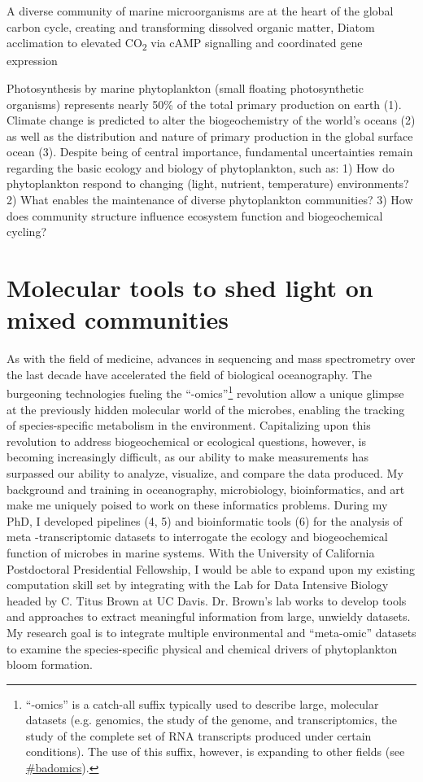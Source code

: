 A diverse community of marine microorganisms are at the heart of the global carbon cycle, creating and transforming dissolved organic matter, 
Diatom acclimation to elevated CO\textsubscript{2} via cAMP signalling and coordinated gene expression

Photosynthesis by marine phytoplankton (small floating photosynthetic organisms) represents nearly 50\% of the total primary production on earth (1). Climate change is predicted to alter the biogeochemistry of the world's oceans (2) as well as the distribution and nature of primary production in the global surface ocean (3). Despite being of central importance, fundamental uncertainties remain regarding the basic ecology and biology of phytoplankton, such as: 1) How do phytoplankton respond to changing (light, nutrient, temperature) environments? 2) What enables the maintenance of diverse phytoplankton communities? 3) How does community structure influence ecosystem function and biogeochemical cycling? 

\section{Molecular tools to shed light on mixed communities}
As with the field of medicine, advances in sequencing and mass spectrometry over the last decade have accelerated the field of biological oceanography. The burgeoning technologies fueling the ``-omics''\footnote{``-omics'' is a catch-all suffix typically used to describe large, molecular datasets (e.g. genomics, the study of the genome, and transcriptomics, the study of the complete set of RNA transcripts produced under certain conditions). The use of this suffix, however, is expanding to other fields (see \href{https://twitter.com/search?q=\%23badomics&src=typd&lang=en}{\#badomics}). }  revolution allow a unique glimpse at the previously hidden molecular world of the microbes, enabling the tracking of species-specific metabolism in the environment. Capitalizing upon this revolution to address biogeochemical or ecological questions, however, is becoming increasingly difficult, as our ability to make measurements has surpassed our ability to analyze, visualize, and compare the data produced. My background and training in oceanography, microbiology, bioinformatics, and art make me uniquely poised to work on these informatics problems. During my PhD, I developed pipelines (4, 5) and bioinformatic tools (6) for the analysis of meta -transcriptomic datasets to interrogate the ecology and biogeochemical function of microbes in marine systems. With the University of California Postdoctoral Presidential Fellowship, I would be able to expand upon my existing computation skill set by integrating with the Lab for Data Intensive Biology headed by C. Titus Brown at UC Davis. Dr. Brown’s lab works to develop tools and approaches to extract meaningful information from large, unwieldy datasets. My research goal is to integrate multiple environmental and “meta-omic” datasets to examine the species-specific physical and chemical drivers of phytoplankton bloom formation. 


